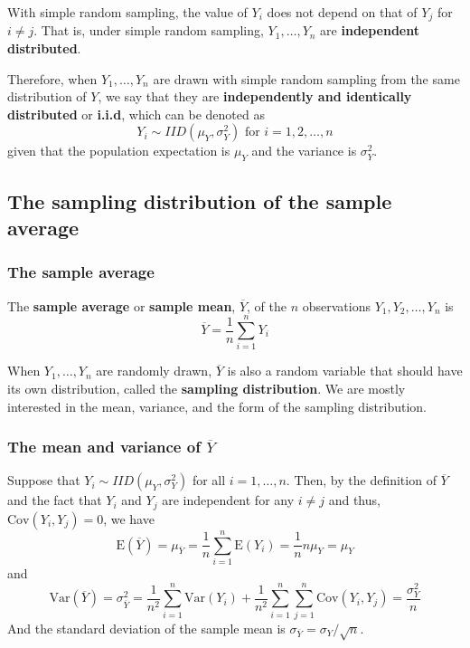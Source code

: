 \documentclass[a4paper,11pt]{article}
\begin{document}
With simple random sampling, the value of \(Y_i\) does not depend on
that of \(Y_j\) for \(i \neq j\). That is, under simple random sampling,
\(Y_1, \ldots, Y_n\) are \textbf{independent distributed}. 

Therefore, when \(Y_1, \ldots, Y_n\) are drawn with simple random
sampling from the same distribution of \(Y\), we say that they are
\textbf{independently and identically distributed} or \textbf{i.i.d}, which can be
denoted as 
\[ Y_i \sim IID(\mu_Y, \sigma^2_Y) \text{ for } i = 1, 2, \ldots, n\]
given that the population expectation is \(\mu_Y\) and the variance
is \(\sigma^2_Y\).


\subsection{The sampling distribution of the sample average}
\label{sec:org0835fe1}

\subsubsection*{The sample average}
\label{sec:org0efb1cf}

The \textbf{sample average} or \textbf{sample mean}, \(\overline{Y}\), of the \(n\)
observations \(Y_1, Y_2, \ldots, Y_n\) is
\[ \overline{Y} = \frac{1}{n}\sum^n_{i=1} Y_i \]

When \(Y_1, \ldots, Y_n\) are randomly drawn, \(\overline{Y}\) is also a
random variable that should have its own distribution, called the
\textbf{sampling distribution}. We are mostly interested in the mean,
variance, and the form of the sampling distribution.

\subsubsection*{The mean and variance of \(\overline{Y}\)}
\label{sec:org6180ae1}

Suppose that \(Y_i \sim IID(\mu_Y, \sigma^2_{Y})\) for all \(i = 1,
\ldots, n\). Then, by the definition of \(\overline{Y}\) and the fact
that \(Y_i\) and \(Y_j\) are independent for any \(i \neq j\) and thus,
\(\mathrm{Cov}(Y_i, Y_j)=0\), we have
\[
\mathrm{E}(\overline{Y}) = \mu_{\overline{Y}} =
\frac{1}{n}\sum^n_{i=1}\mathrm{E}(Y_i) = \frac{1}{n} n \mu_Y = \mu_Y
\]
and
\[
\mathrm{Var}(\overline{Y}) = \sigma^2_{\overline{Y}} =  \frac{1}{n^2}\sum^n_{i=1}\mathrm{Var}(Y_i) +
\frac{1}{n^2}\sum^n_{i=1}\sum^n_{j=1}\mathrm{Cov}(Y_i, Y_j) =
\frac{\sigma^2_Y}{n}
\]
And the standard deviation of the sample mean is
\(\sigma_{\overline{Y}} = \sigma_Y / \sqrt{n}\).
\end{document}
